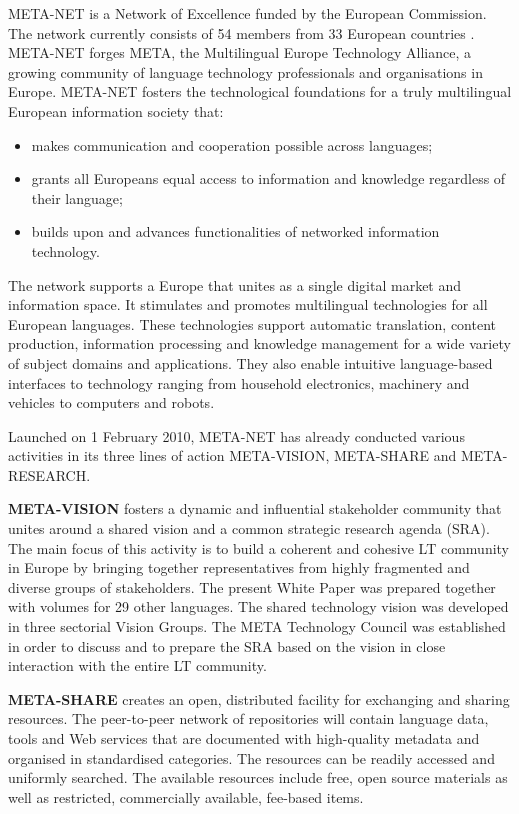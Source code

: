 \begin{multicols}{2}
META-NET is a Network of Excellence funded by the European Commission. The network currently consists of 54 members from 33 European countries \cite{rehm2011}. META-NET forges META, the Multilingual Europe Technology Alliance, a growing community of language technology professionals and organisations in Europe. META-NET fosters the technological foundations for a truly multilingual European information society that:

\begin{itemize}
\item makes communication and cooperation possible across languages;
\item grants all Europeans equal access to information and knowledge regardless of their language; 
\item builds upon and advances functionalities of networked information technology.
\end{itemize}

The network supports a Europe that unites as a single digital market and information space. It stimulates and promotes multilingual technologies for all European languages. These technologies support automatic translation, content production, information processing and knowledge management for a wide variety of subject domains and applications. They also enable intuitive language-based interfaces to technology ranging from household electronics, machinery and vehicles to computers and robots.

Launched on 1 February 2010, META-NET has already conducted various activities in its three lines of action META-VISION, META-SHARE and META-RESEARCH. 

\textbf{META-VISION} fosters a dynamic and inﬂuential stakeholder community that unites around a shared vision and a common strategic research agenda (SRA). The main focus of this activity is to build a coherent and cohesive LT community in Europe by bringing together representatives from highly fragmented and diverse groups of stakeholders. The present White Paper was prepared together with volumes for 29 other languages. The shared technology vision was developed in three sectorial Vision Groups. The META Technology Council was established in order to discuss and to prepare the SRA based on the vision in close interaction with the entire LT community. 

\textbf{META-SHARE} creates an open, distributed facility for exchanging and sharing resources. The peer-to-peer network of repositories will contain language data, tools and Web services that are documented with high-quality metadata and organised in standardised categories. The resources can be readily accessed and uniformly searched. The available resources include free, open source materials as well as restricted, commercially available, fee-based items. 


\end{multicols}
